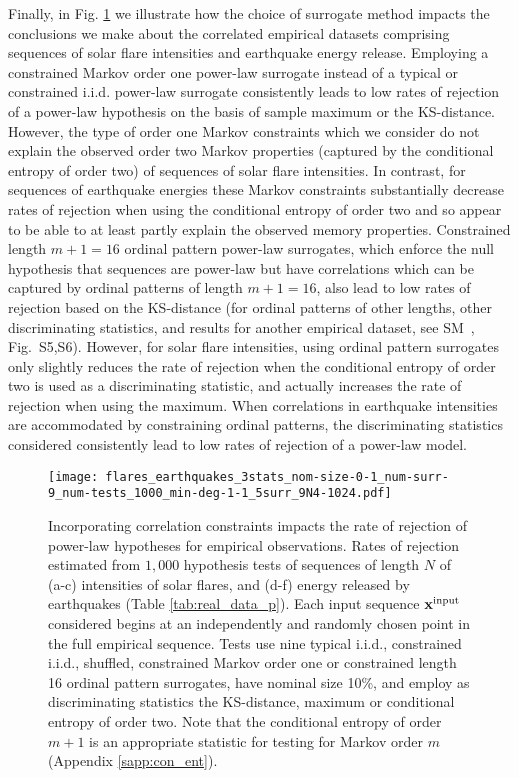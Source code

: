\documentclass[%
prx,
reprint,
superscriptaddress,
nofootinbib,
 amsmath,amssymb,
 aps,
floatfix,
]{revtex4-2}
\newcommand{\xin}{{{\bf x}^{\text{input}}}}
\begin{document}
Finally, in Fig. \ref{fig:real_corr} we illustrate how the choice of surrogate method impacts the conclusions we make about the correlated empirical datasets comprising sequences of solar flare intensities and earthquake energy release. Employing a constrained Markov order one power-law surrogate instead of a typical or constrained i.i.d. power-law surrogate consistently leads to low rates of rejection of a power-law hypothesis on the basis of sample maximum or the KS-distance. However, the type of order one Markov constraints which we consider do not explain the observed order two Markov properties (captured by the conditional entropy of order two) of sequences of solar flare intensities. In contrast, for sequences of earthquake energies these Markov constraints substantially decrease rates of rejection when using the conditional entropy of order two and so appear to be able to at least partly explain the observed memory properties. Constrained length $m + 1 = 16$ ordinal pattern power-law surrogates, which enforce the null hypothesis that sequences are power-law but have correlations which can be captured by ordinal patterns of length $m + 1 = 16$, also lead to low rates of rejection based on the KS-distance (for ordinal patterns of other lengths, other discriminating statistics, and results for another empirical dataset, see SM~\cite{supplemental}, {Fig.~S5,S6}). However, for solar flare intensities, using ordinal pattern surrogates only slightly reduces the rate of rejection when the conditional entropy of order two is used as a discriminating statistic, and actually increases the rate of rejection when using the maximum. When correlations in earthquake intensities are accommodated by constraining ordinal patterns, the discriminating statistics considered consistently lead to low rates of rejection of a power-law model.

\begin{figure}[htbp]
\texttt{[image: flares\_earthquakes\_3stats\_nom-size-0-1\_num-surr-9\_num-tests\_1000\_min-deg-1-1\_5surr\_9N4-1024.pdf]}
\caption{Incorporating correlation constraints impacts the rate of rejection of power-law hypotheses for empirical observations. Rates of rejection estimated from $1,000$ hypothesis tests of sequences of length $N$ of (a-c) intensities of solar flares, and (d-f) energy released by earthquakes (Table \ref{tab:real_data_p}). Each input sequence $\xin$ considered begins at an independently and randomly chosen point in the full empirical sequence. Tests use nine typical i.i.d., constrained i.i.d., shuffled, constrained Markov order one or constrained length 16 ordinal pattern surrogates, have nominal size 10\%, and employ as discriminating statistics the KS-distance, maximum or conditional entropy of order two. Note that the conditional entropy of order $m + 1$ is an appropriate statistic for testing for Markov order $m$ (Appendix \ref{sapp:con_ent}).
}
\label{fig:real_corr}
\end{figure}
\end{document}
